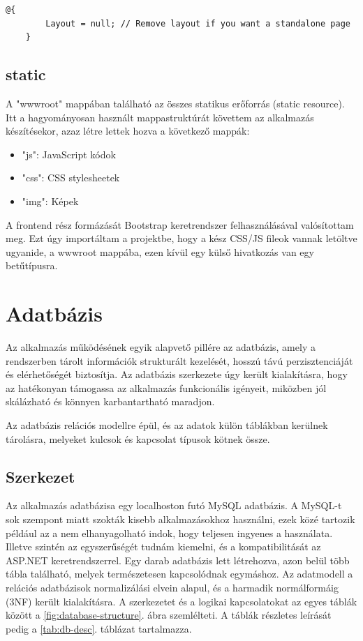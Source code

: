 \begin{lstlisting}[language={[Sharp]C}]
	@{
		Layout = null; // Remove layout if you want a standalone page
	}
\end{lstlisting}

\subsection{static}
A "wwwroot" mappában található az összes statikus erőforrás (static resource). Itt a hagyományosan használt mappastruktúrát követtem az alkalmazás készítésekor, azaz létre lettek hozva a következő mappák:
\begin{itemize}
	\item "js": JavaScript kódok
	\item "css": CSS stylesheetek
	\item "img": Képek  
\end{itemize}
A frontend rész formázását Bootstrap keretrendszer felhasználásával valósítottam meg. Ezt úgy importáltam a projektbe, hogy a kész CSS/JS fileok vannak letöltve ugyanide, a wwwroot mappába, ezen kívül egy külső hivatkozás van egy betűtípusra. 

\section{Adatbázis}
Az alkalmazás működésének egyik alapvető pillére az adatbázis, amely a rendszerben tárolt információk strukturált kezelését, hosszú távú perzisztenciáját és elérhetőségét biztosítja. Az adatbázis szerkezete úgy került kialakításra, hogy az hatékonyan támogassa az alkalmazás funkcionális igényeit, miközben jól skálázható és könnyen karbantartható maradjon.

Az adatbázis relációs modellre épül, és az adatok külön táblákban kerülnek tárolásra, melyeket kulcsok és kapcsolat típusok kötnek össze.

\subsection{Szerkezet}
Az alkalmazás adatbázisa egy localhoston futó MySQL adatbázis.
A MySQL-t sok szempont miatt szokták kisebb alkalmazásokhoz
használni, ezek közé tartozik például az a nem elhanyagolható
indok, hogy teljesen ingyenes a használata. Illetve szintén
az egyszerűségét tudnám kiemelni, és a kompatibilitását az ASP.NET keretrendszerrel. Egy darab adatbázis lett létrehozva, azon belül több tábla található, melyek természetesen kapcsolódnak egymáshoz. Az adatmodell a relációs adatbázisok normalizálási elvein alapul, és a harmadik normálformáig (3NF) került kialakításra.
A szerkezetet és a logikai kapcsolatokat az egyes táblák között a \ref{fig:database-structure}. ábra szemlélteti. A táblák részletes leírását pedig a \ref{tab:db-desc}. táblázat tartalmazza.

